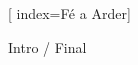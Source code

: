 %


[	                               						%
	index={Fé a Arder}]                                   						%
            
\beginverse                                           								%

Intro / Final


